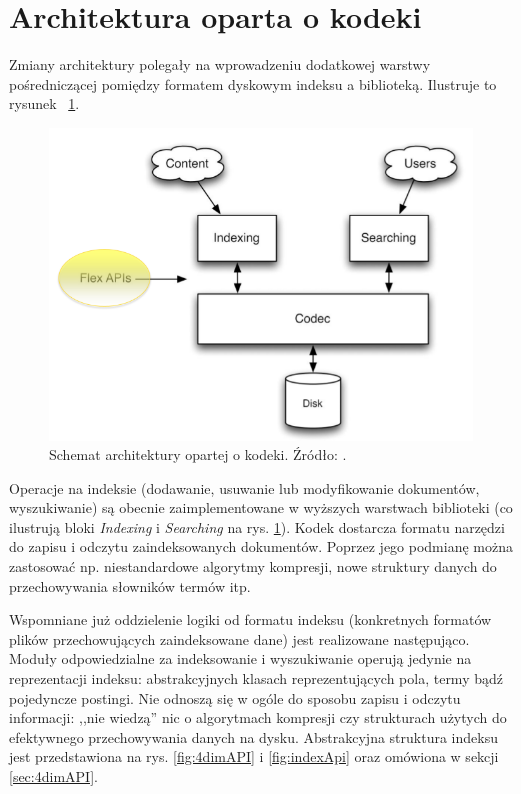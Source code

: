 \section{Architektura oparta o kodeki}

Zmiany architektury polegały na wprowadzeniu dodatkowej warstwy pośredniczącej pomiędzy formatem dyskowym indeksu a biblioteką. Ilustruje to rysunek ~\ref{fig:newarchitecture}.

\begin{figure}[here]
 \includegraphics[scale=0.5]{pictures/architecture.png}
 \caption{Schemat architektury opartej o kodeki. Źródło: \cite{flexindex}.\label{fig:newarchitecture}}
\end{figure}

Operacje na indeksie (dodawanie, usuwanie lub modyfikowanie dokumentów, wyszukiwanie) są obecnie zaimplementowane w wyższych warstwach biblioteki (co ilustrują bloki \emph{Indexing} i \emph{Searching} na rys. \ref{fig:newarchitecture}). Kodek dostarcza formatu narzędzi do zapisu i odczytu zaindeksowanych dokumentów. Poprzez jego podmianę można zastosować np. niestandardowe algorytmy kompresji, nowe struktury danych do przechowywania słowników termów itp.

Wspomniane już oddzielenie logiki od formatu indeksu (konkretnych formatów plików przechowujących zaindeksowane dane) jest realizowane następująco. Moduły odpowiedzialne za indeksowanie i wyszukiwanie operują jedynie na reprezentacji indeksu: abstrakcyjnych klasach reprezentujących pola, termy bądź pojedyncze postingi. Nie odnoszą się w ogóle do sposobu zapisu i odczytu informacji: ,,nie wiedzą'' nic o algorytmach kompresji czy strukturach użytych do efektywnego przechowywania danych na dysku. Abstrakcyjna struktura indeksu jest przedstawiona na rys. \ref{fig:4dimAPI} i \ref{fig:indexApi} oraz omówiona w sekcji \ref{sec:4dimAPI}.

